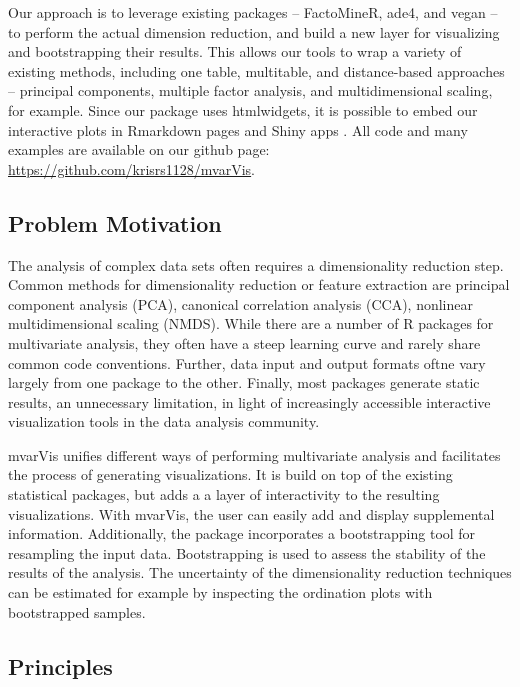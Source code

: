 Our approach is to leverage existing packages -- FactoMineR, ade4, and vegan
\citep{le2008factominer, dray2007ade4, oksanen2007vegan} -- to perform the
actual dimension reduction, and build a new layer for visualizing and
bootstrapping their results. This allows our tools to wrap a variety of existing
methods, including one table, multitable, and distance-based approaches --
principal components, multiple factor analysis, and multidimensional scaling,
for example. Since our package uses htmlwidgets, it is possible to embed our
interactive plots in Rmarkdown pages and Shiny apps
\citep{vaidyanathan2014htmlwidgets}. All code and many examples are available on
our github page: \url{https://github.com/krisrs1128/mvarVis}.

\subsection{Problem Motivation}

The analysis of complex data sets often requires a dimensionality reduction
step. Common methods for dimensionality reduction or feature extraction are
principal component analysis (PCA), canonical correlation analysis (CCA),
nonlinear multidimensional scaling (NMDS). While there are a number of R
packages for multivariate analysis, they often have a steep learning curve and
rarely share common code conventions. Further, data input and output formats
oftne vary largely from one package to the other. Finally, most packages
generate static results, an unnecessary limitation, in light of increasingly
accessible interactive visualization tools in the data analysis community.

mvarVis unifies different ways of performing multivariate analysis and
facilitates the process of generating visualizations. It is build on top of the
existing statistical packages, but adds a a layer of interactivity to the
resulting visualizations. With mvarVis, the user can easily add and display
supplemental information. Additionally, the package incorporates a bootstrapping
tool for resampling the input data. Bootstrapping is used to assess the
stability of the results of the analysis. The uncertainty of the dimensionality
reduction techniques can be estimated for example by inspecting the ordination
plots with bootstrapped samples.

\subsection{Principles}

